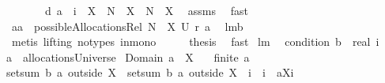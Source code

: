 \begin{isabellebody}
\ \ \isamarkupfalse%
\ \isamarkupfalse%
\ \isamarkupfalse%
\ {\isachardoublequoteopen}{\isacharparenleft}{\isacharquery}d\ a\ {\isasymunion}\ {\isacharbraceleft}i{\isacharbraceright}\ {\isacharminus}\ X{\isacharparenright}\ {\isasymunion}\ {\isacharparenleft}N\ {\isacharminus}\ X{\isacharparenright}\ {\isacharequal}\ N\ {\isacharminus}\ X{\isachardoublequoteclose}\ \isamarkupfalse%
\ assms\ \isamarkupfalse%
\ fast\isanewline
\ \ \isamarkupfalse%
\ \isamarkupfalse%
\ {\isachardoublequoteopen}{\isacharquery}aa\ {\isasymin}\ possibleAllocationsRel\ {\isacharparenleft}N\ {\isacharminus}\ X{\isacharparenright}\ {\isacharparenleft}{\isacharquery}U\ {\isacharparenleft}{\isacharquery}r\ a{\isacharparenright}{\isacharparenright}{\isachardoublequoteclose}\ \isamarkupfalse%
\ lm{}{}b\ \isanewline
\ \ \isamarkupfalse%
\ {\isacharparenleft}metis\ {\isacharparenleft}lifting{\isacharcomma}\ no{\isacharunderscore}types{\isacharparenright}\ in{\isacharunderscore}mono{\isacharparenright}\isanewline
\ \ \isamarkupfalse%
\ \isamarkupfalse%
\ {\isacharquery}thesis\ \isamarkupfalse%
\ fast\isanewline
{}\isamarkupfalse%
%
\endisatagproof
{\isafoldproof}%
%
\isadelimproof
\isanewline
%
\endisadelimproof
\isanewline
{}\isamarkupfalse%
\ lm{}{}{\isacharcolon}\ \ \isanewline
{\isachardoublequoteopen}condition{}\ {\isacharparenleft}b{\isacharcolon}{\isacharcolon}{\isacharunderscore}\ {\isacharequal}{\isachargreater}\ real{\isacharparenright}\ i{\isachardoublequoteclose}\ \isanewline
{\isachardoublequoteopen}a\ {\isasymin}\ allocationsUniverse{\isachardoublequoteclose}\ \isanewline
{\isachardoublequoteopen}Domain\ a\ {\isasyminter}\ X\ {\isasymnoteq}\ {\isacharbraceleft}{\isacharbraceright}{\isachardoublequoteclose}\ \isanewline
{\isachardoublequoteopen}finite\ a{\isachardoublequoteclose}\ \ \isanewline
{\isachardoublequoteopen}setsum\ b\ {\isacharparenleft}a\ outside\ X{\isacharparenright}\ {\isasymle}\ setsum\ b\ {\isacharparenleft}a\ outside\ {\isacharparenleft}X\ {\isasymunion}\ {\isacharbraceleft}i{\isacharbraceright}{\isacharparenright}\ {\isasymunion}\ {\isacharparenleft}{\isacharbraceleft}i{\isacharbraceright}\ {\isasymtimes}\ {\isacharbraceleft}{\isasymUnion}{\isacharparenleft}a{\isacharbackquote}{\isacharbackquote}{\isacharparenleft}X{\isasymunion}{\isacharbraceleft}i{\isacharbraceright}{\isacharparenright}{\isacharparenright}{\isacharbraceright}{\isacharparenright}{\isacharparenright}{\isachardoublequoteclose}\isanewline

\end{isabellebody}
